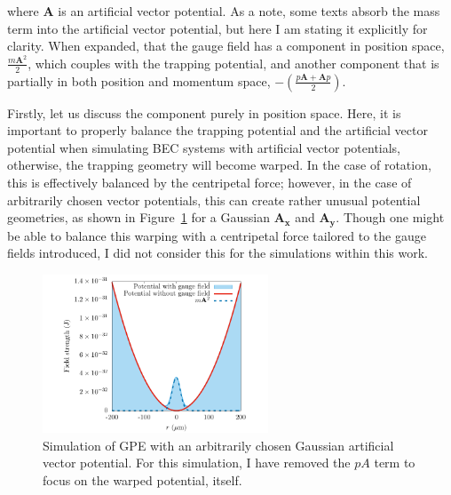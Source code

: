 \noindent where $\mathbf{A}$ is an artificial vector potential.
As a note, some texts absorb the mass term into the artificial vector potential, but here I am  stating it explicitly for clarity.
When expanded, that the gauge field has a component in position space, $\frac{m\mathbf{A}^2}{2}$, which couples with the trapping potential, and another component that is partially in both position and momentum space, $-\left(\frac{p\mathbf{A} + \mathbf{A}p}{2}\right)$.

Firstly, let us discuss the component purely in position space.
Here, it is important to properly balance the trapping potential and the artificial vector potential when simulating BEC systems with artificial vector potentials, otherwise, the trapping geometry will become warped.
In the case of rotation, this is effectively balanced by the centripetal force; however, 
in the case of arbitrarily chosen vector potentials, this can create rather unusual potential geometries, as shown in Figure~\ref{fig:V_change} for a Gaussian $\mathbf{A_x}$ and $\mathbf{A_y}$.
Though one might be able to balance this warping with a centripetal force tailored to the gauge fields introduced, I did not consider this for the simulations within this work.

\begin{figure}

\center \includegraphics[width=0.6\textwidth]{data/splitop/gauge/check.pdf}

\caption{
Simulation of GPE with an arbitrarily chosen Gaussian artificial vector potential.
For this simulation, I have removed the $pA$ term to focus on the warped potential, itself.}
\label{fig:V_change}
\end{figure}

